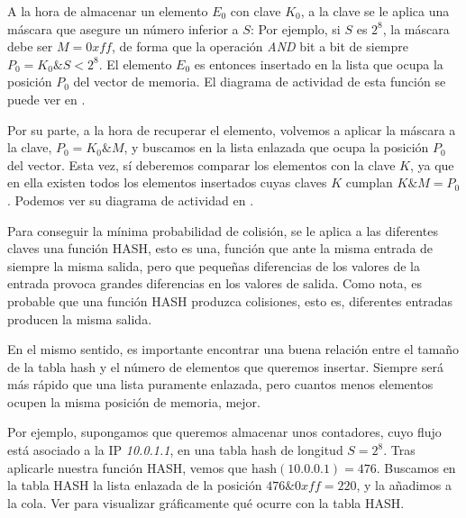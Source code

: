 A la hora de almacenar un elemento $E_0$ con clave $K_0$, a la clave se le aplica una máscara que asegure un número 
inferior a $S$: Por ejemplo, si $S$ es $2^8$, la máscara debe ser $M=0xff$, de forma que la operación \emph{AND} bit a 
bit de siempre $P_0=K_0\&S<2^8$. El elemento $E_0$ es entonces insertado en la lista que ocupa la posición $P_0$ del 
vector de memoria. El diagrama de actividad de esta función se puede ver en .

Por su parte, a la hora de recuperar el elemento, volvemos a aplicar la máscara a la clave, $P_0=K_0\&M$, y buscamos en 
la lista enlazada que ocupa la posición $P_0$ del vector. Esta vez, sí deberemos comparar los elementos con la clave 
$K$, ya que en ella existen todos los elementos insertados cuyas claves $K$ cumplan $K\&M=P_0$. Podemos ver su diagrama 
de actividad en .

Para conseguir la mínima probabilidad de colisión, se le aplica a las diferentes claves una función HASH, esto es una, función que ante la misma entrada de siempre la misma salida, pero que pequeñas diferencias de los 
valores de la entrada provoca grandes diferencias en los valores de salida. Como nota, es probable que una función HASH 
produzca colisiones, esto es, diferentes entradas producen la misma salida.

En el mismo sentido, es importante encontrar una buena relación entre el tamaño de la tabla hash y el número de 
elementos que queremos insertar. Siempre será más rápido que una lista puramente enlazada, pero cuantos menos elementos 
ocupen la misma posición de memoria, mejor.


Por ejemplo, supongamos que queremos almacenar unos contadores, cuyo flujo está asociado a la \gls{IP} \emph{10.0.1.1}, 
en una tabla hash de longitud $S=2^8$. Tras aplicarle nuestra función HASH, vemos que 
$\text{hash}(\text{10.0.0.1})=476$. Buscamos en la tabla HASH la lista enlazada de la posición 
$476\&0xff=220$, y la añadimos a la cola. Ver  para visualizar gráficamente qué ocurre 
con la tabla HASH.

